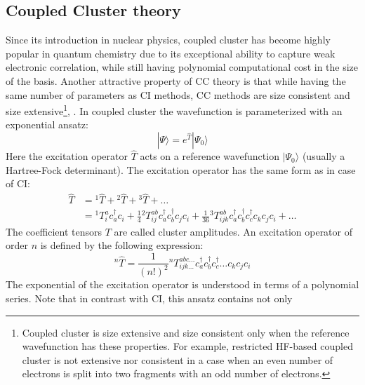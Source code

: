 \subsection{Coupled Cluster theory}
Since its introduction in nuclear physics,\cite{coester1958bound, 
coester1960short} coupled cluster has become highly popular in quantum 
chemistry due to its exceptional ability to capture weak electronic 
correlation, while still having polynomial computational cost in the size of 
the basis. Another attractive property of CC theory is that while having the 
same number of parameters as CI methods, CC methods are size consistent and 
size extensive\footnote{Coupled cluster is size 
extensive and size consistent only when the reference 
wavefunction has these properties. For example, 
restricted HF-based coupled cluster is not extensive nor consistent in a case 
when an even number of electrons is split into two fragments with an odd number 
of electrons.}, \cite{pople1978electron, 
bartlett1978many, crawford2000introduction, bartlett2007coupled}. In coupled 
cluster the wavefunction is parameterized with an exponential ansatz:
%
\begin{equation}
 |\Psi\rangle = e^{\hat{T}} |\Psi_{0}\rangle
 \label{eq:cc_ansatz}
\end{equation}
Here the excitation operator $\hat{T}$ acts on a reference wavefunction 
$|\Psi_{0}\rangle$ (usually a Hartree-Fock determinant). The excitation 
operator has the same form as in case of CI:
%
\begin{equation}
\begin{aligned}
 \hat{T} &= {}^1\hat{T} + {}^2\hat{T} + {}^3\hat{T} + \ldots \\ 
 &= {}^{1}T_{i}^{a} c^{\dagger}_{a} c_{i} + \frac{1}{4} {}^2T_{ij}^{ab} 
c^{\dagger}_{a} c^{\dagger}_{b} c_{j} c_{i} + \frac{1}{36} {}^3T_{ijk}^{ab} 
c^{\dagger}_{a} c^{\dagger}_{b} c^{\dagger}_{c} c_{k} c_{j} c_{i} 
+\ldots
\end{aligned}
\end{equation}
The coefficient tensors $T$ are called cluster amplitudes. An excitation 
operator of order $n$ is defined by the following expression:
%
\begin{equation}
 {}^{n}\hat{T} = \frac{1}{(n!)^2}{}^{n}T_{ijk\ldots}^{abc\ldots} 
c^{\dagger}_{a} c^{\dagger}_{b} c^{\dagger}_{c} \ldots c_{k} c_{j} 
c_{i} 
\end{equation}
%
The exponential of the excitation operator is understood in terms of a 
polynomial series. Note that in contrast with CI, this ansatz contains not only 
